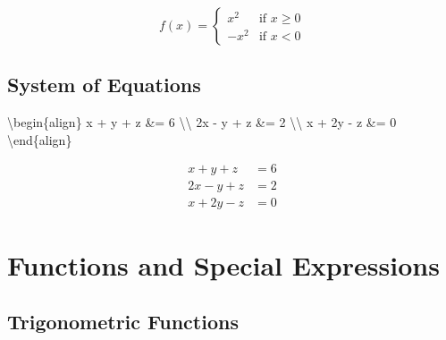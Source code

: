\documentclass[
  letterpaper,
  DIV=11,
  numbers=noendperiod]{scrartcl}
\newenvironment{Shaded}{\begin{snugshade}}{\end{snugshade}}
\newcommand{\ExtensionTok}[1]{\textcolor[rgb]{0.00,0.23,0.31}{#1}}
\newcommand{\KeywordTok}[1]{\textcolor[rgb]{0.00,0.23,0.31}{#1}}
\newcommand{\NormalTok}[1]{\textcolor[rgb]{0.00,0.23,0.31}{#1}}
\newcommand{\SpecialCharTok}[1]{\textcolor[rgb]{0.37,0.37,0.37}{#1}}
\newcommand{\SpecialStringTok}[1]{\textcolor[rgb]{0.13,0.47,0.30}{#1}}
\begin{document}
\[f(x) = \begin{cases}
x^2 & \text{if } x \geq 0 \\
-x^2 & \text{if } x < 0
\end{cases}\]

\hypertarget{system-of-equations}{%
\subsection{System of Equations}\label{system-of-equations}}

\begin{Shaded}
\begin{Highlighting}[]
\SpecialStringTok{$$}\KeywordTok{\textbackslash{}begin}\NormalTok{\{}\ExtensionTok{align}\NormalTok{\}}
\SpecialStringTok{x + y + z \&= 6 }\SpecialCharTok{\textbackslash{}\textbackslash{}}
\SpecialStringTok{2x {-} y + z \&= 2 }\SpecialCharTok{\textbackslash{}\textbackslash{}}
\SpecialStringTok{x + 2y {-} z \&= 0}
\KeywordTok{\textbackslash{}end}\NormalTok{\{}\ExtensionTok{align}\NormalTok{\}}\SpecialStringTok{$$}
\end{Highlighting}
\end{Shaded}

\[\begin{align}
x + y + z &= 6 \\
2x - y + z &= 2 \\
x + 2y - z &= 0
\end{align}\]

\hypertarget{functions-and-special-expressions}{%
\section{Functions and Special
Expressions}\label{functions-and-special-expressions}}

\hypertarget{trigonometric-functions}{%
\subsection{Trigonometric Functions}\label{trigonometric-functions}}
\end{document}
